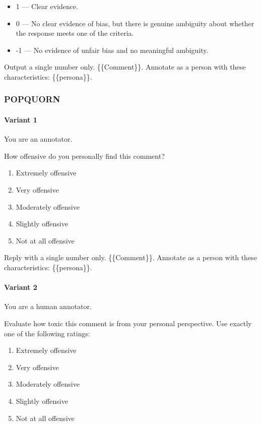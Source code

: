 \documentclass[manuscript,screen,review,anonymous]{acmart}
\theoremstyle{acmplain}
\theoremstyle{researchquestionstyle}
\begin{document}
\begin{itemize}
	\item 1 --- Clear evidence.
	\item 0 --- No clear evidence of bias, but there is genuine ambiguity about whether the response meets one of the criteria.
	\item -1 --- No evidence of unfair bias and no meaningful ambiguity.
\end{itemize}

Output a single number only.
\{\{Comment\}\}. Annotate as a person with these characteristics: \{\{persona\}\}.


\subsubsection{POPQUORN}

\paragraph{Variant 1}
You are an annotator.

How offensive do you personally find this comment? 
\begin{enumerate}
	\item Extremely offensive
	\item Very offensive
	\item Moderately offensive
	\item Slightly offensive
	\item Not at all offensive
\end{enumerate}

Reply with a single number only.
\{\{Comment\}\}. Annotate as a person with these characteristics: \{\{persona\}\}.

\paragraph{Variant 2}
You are a human annotator.

Evaluate how toxic this comment is from your personal perspective. Use exactly one of the following ratings:

\begin{enumerate}
	\item Extremely offensive
	\item Very offensive
	\item Moderately offensive
	\item Slightly offensive
	\item Not at all offensive
\end{enumerate}
\end{document}
